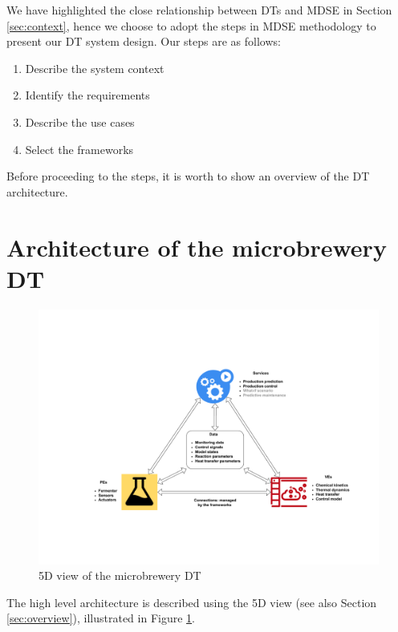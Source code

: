 We have highlighted the close relationship between DTs and MDSE in Section \ref{sec:context}, hence we choose to adopt the steps in MDSE methodology to present our DT system design. Our steps are as follows:

\begin{enumerate}

\item Describe the system context
\item Identify the requirements
\item Describe the use cases
\item Select the frameworks

\end{enumerate}

Before proceeding to the steps, it is worth to show an overview of the DT architecture.

\section{Architecture of the microbrewery DT}\label{sec:5dbrewery}
\begin{figure}[hbt!]
  \centering
  \includegraphics[scale=0.45]{figures/brewery5d.pdf}
  \caption{5D view of the microbrewery DT}
  \label{fig:brewery5d}
\end{figure}

The high level architecture is described using the 5D view (see also Section \ref{sec:overview}), illustrated in Figure \ref{fig:brewery5d}.

